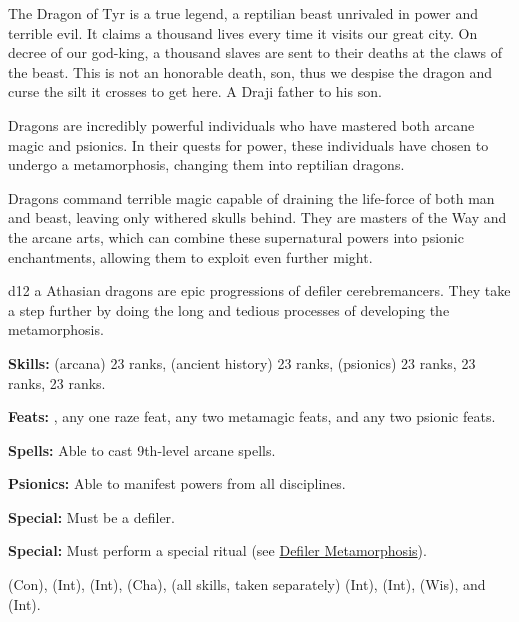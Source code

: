 {The Dragon of Tyr is a true legend, a reptilian beast unrivaled in power and terrible evil. It claims a thousand lives every time it visits our great city. On decree of our god-king, a thousand slaves are sent to their deaths at the claws of the beast. This is not an honorable death, son, thus we despise the dragon and curse the silt it crosses to get here.}
{A Draji father to his son.}
{
Dragons are incredibly powerful individuals who have mastered both arcane magic and psionics. In their quests for power, these individuals have chosen to undergo a metamorphosis, changing them into reptilian dragons.

Dragons command terrible magic capable of draining the life-force of both man and beast, leaving only withered skulls behind. They are masters of the Way and the arcane arts, which can combine these supernatural powers into psionic enchantments, allowing them to exploit even further might.
}
{d12}
{a}
{
Athasian dragons are epic progressions of defiler cerebremancers. They take a step further by doing the long and tedious processes of developing the metamorphosis.
}
{
\textbf{Skills:}  (arcana) 23 ranks,  (ancient history) 23 ranks,  (psionics) 23 ranks,  23 ranks,  23 ranks.

\textbf{Feats:} , any one raze feat, any two metamagic feats, and any two psionic feats.

\textbf{Spells:} Able to cast 9th-level arcane spells.

\textbf{Psionics:} Able to manifest powers from all disciplines.

\textbf{Special:} Must be a defiler.

\textbf{Special:} Must perform a special ritual (see \hyperref[Defiler Metamorphosis]{Defiler Metamorphosis}).
}
{
 (Con),  (Int),  (Int),  (Cha),  (all skills, taken separately) (Int),  (Int),  (Wis), and  (Int).
}
